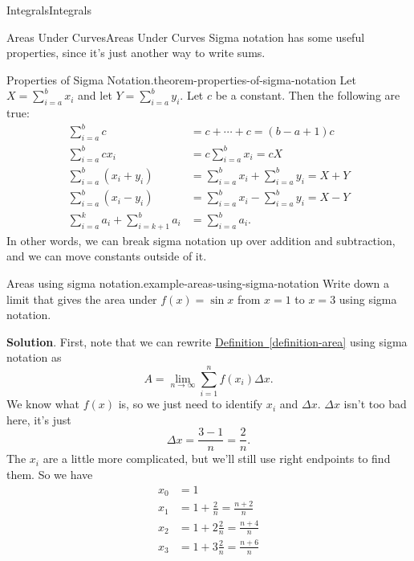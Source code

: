 \documentclass[10pt,]{book}
\numberwithin{equation}{section}
\begin{document}
\begin{chapterptx}{Integrals}{}{Integrals}{}{}
\begin{sectionptx}{Areas Under Curves}{}{Areas Under Curves}{}{}
\hypertarget{p-415}{}%
Sigma notation has some useful properties, since it's just another way to write sums.%
\begin{theorem}{Properties of Sigma Notation.}{}{theorem-properties-of-sigma-notation}%
\hypertarget{p-416}{}%
Let \(X = \sum_{i=a}^{b}x_{i}\) and let \(Y = \sum_{i=a}^{b}y_{i}\). Let \(c\) be a constant. Then the following are true:%
\begin{align*}
\sum_{i=a}^{b}c & = c+\cdots+c = (b-a+1)c \\
\sum_{i=a}^{b}cx_{i} & = c\sum_{i=a}^{b}x_{i} = cX \\
\sum_{i=a}^{b}(x_{i}+y_{i}) & = \sum_{i=a}^{b}x_{i} + \sum_{i=a}^{b}y_{i} = X + Y \\
\sum_{i=a}^{b}(x_{i} - y_{i}) & = \sum_{i=a}^{b}x_{i} - \sum_{i=a}^{b}y_{i} = X - Y \\
\sum_{i=a}^{k}a_{i} + \sum_{i=k+1}^{b}a_{i} & = \sum_{i=a}^{b}a_{i}. 
\end{align*}
In other words, we can break sigma notation up over addition and subtraction, and we can move constants outside of it.%
\end{theorem}
\begin{example}{Areas using sigma notation.}{example-areas-using-sigma-notation}%
\hypertarget{p-417}{}%
Write down a limit that gives the area under \(f(x) = \sin x\) from \(x=1\) to \(x = 3\) using sigma notation.%
\par\smallskip%
\noindent\textbf{Solution}.\hypertarget{solution-92}{}\quad%
\hypertarget{p-418}{}%
First, note that we can rewrite \hyperref[definition-area]{Definition~\ref{definition-area}} using sigma notation as%
\begin{equation*}
A = \lim_{n\to\infty}\sum_{i=1}^{n}f(x_{i})\Delta x.
\end{equation*}
We know what \(f(x)\) is, so we just need to identify \(x_{i}\) and \(\Delta x\). \(\Delta x\) isn't too bad here, it's just%
\begin{equation*}
\Delta x = \frac{3-1}{n} = \frac{2}{n}.
\end{equation*}
The \(x_{i}\) are a little more complicated, but we'll still use right endpoints to find them. So we have%
\begin{align*}
x_{0} & = 1 \\
x_{1} & = 1 + \frac{2}{n} = \frac{n+2}{n} \\
x_{2} & = 1 + 2\frac{2}{n} = \frac{n+4}{n} \\
x_{3} & = 1 + 3\frac{2}{n} = \frac{n+6}{n} \\

\end{align*}
\end{example}
\end{sectionptx}
\end{chapterptx}
\end{document}
